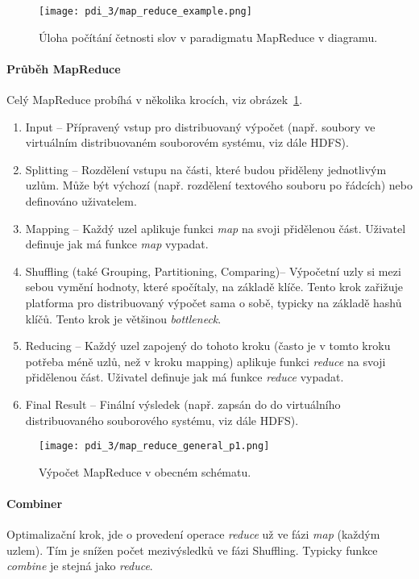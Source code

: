\begin{figure}[H]
    \centering
    \texttt{[image: pdi\_3/map\_reduce\_example.png]}
    \caption{Úloha počítání četnosti slov v paradigmatu MapReduce v diagramu.}
    \label{49_map_reduce_example}
\end{figure}

\paragraph*{Průběh MapReduce} Celý MapReduce probíhá v několika krocích, viz obrázek~\ref{49_map_reduce_example}.
\begin{enumerate}
    \item Input -- Přípravený vstup pro distribuovaný výpočet (např. soubory ve virtuálním distribuovaném souborovém systému, viz dále HDFS).
    \item Splitting -- Rozdělení vstupu na části, které budou přiděleny jednotlivým uzlům. Může být výchozí (např. rozdělení textového souboru po řádcích) nebo definováno uživatelem.
    \item Mapping -- Každý uzel aplikuje funkci \textit{map} na svoji přidělenou část. Uživatel definuje jak má funkce \textit{map} vypadat.
    \item Shuffling (také Grouping, Partitioning, Comparing)-- Výpočetní uzly si mezi sebou vymění hodnoty, které spočítaly, na základě klíče. Tento krok zařižuje platforma pro distribuovaný výpočet sama o sobě, typicky na základě hashů klíčů. Tento krok je většinou \textit{bottleneck}.
    \item Reducing -- Každý uzel zapojený do tohoto kroku (často je v tomto kroku potřeba méně uzlů, než v kroku mapping) aplikuje funkci \textit{reduce} na svoji přidělenou část. Uživatel definuje jak má funkce \textit{reduce} vypadat.
    \item Final Result -- Finální výsledek (např. zapsán do do virtuálního distribuovaného souborového systému, viz dále HDFS).
\end{enumerate}

\begin{figure}[H]
    \centering
    \texttt{[image: pdi\_3/map\_reduce\_general\_p1.png]}
    \caption{Výpočet MapReduce v obecném schématu.}
\end{figure}

\paragraph*{Combiner} Optimalizační krok, jde o  provedení operace \textit{reduce} už ve fázi \textit{map} (každým uzlem). Tím je snížen počet mezivýsledků ve fázi Shuffling. Typicky funkce \textit{combine} je stejná jako \textit{reduce}.

